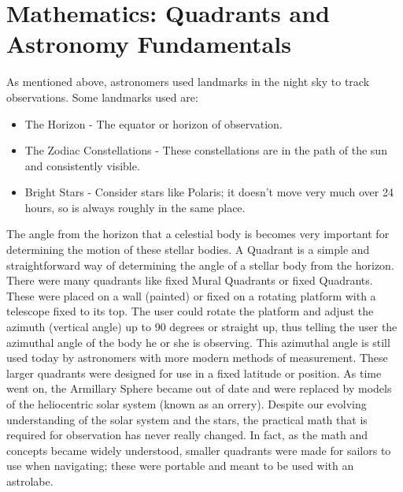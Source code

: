 \documentclass[12pt,oneside,a4paper,english]{article}
\begin{document}
\section{Mathematics: Quadrants and Astronomy Fundamentals}
As mentioned above, astronomers used landmarks in the night sky to track observations. Some landmarks used are:
\begin{itemize}
\item The Horizon - The equator or horizon of observation.
\item The Zodiac Constellations - These constellations are in the path of the sun and consistently visible.
\item Bright Stars - Consider stars like Polaris; it doesn't move very much over 24 hours, so is always roughly in the same place.
\end{itemize}
The angle from the horizon that a celestial body is becomes very important for determining the motion of these stellar bodies. A Quadrant is a simple and straightforward way of determining the angle of a stellar body from the horizon. There were many quadrants like fixed Mural Quadrants or fixed Quadrants. These were placed on a wall (painted) or fixed on a rotating platform with a telescope fixed to its top. The user could rotate the platform and adjust the azimuth (vertical angle) up to 90 degrees or straight up, thus telling the user the azimuthal angle of the body he or she is observing. This azimuthal angle is still used today by astronomers with more modern methods of measurement. These larger quadrants were designed for use in a fixed latitude or position. As time went on, the Armillary Sphere became out of date and were replaced by models of the heliocentric solar system (known as an orrery). Despite our evolving understanding of the solar system and the stars, the practical math that is required for observation has never really changed. In fact, as the math and concepts became widely understood, smaller quadrants were made for sailors to use when navigating; these were portable and meant to be used with an astrolabe.\cite{quadrant}
\end{document}
